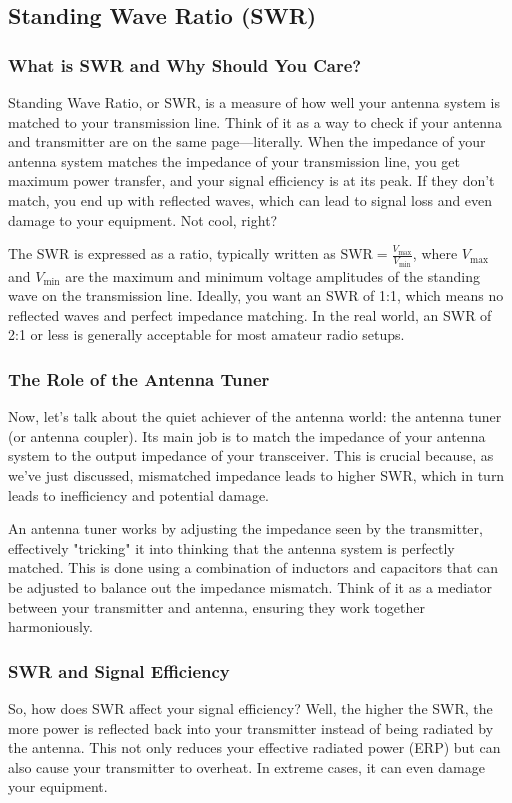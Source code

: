\subsection{Standing Wave Ratio (SWR)}
\label{subsec:standing-wave}

\subsubsection*{What is SWR and Why Should You Care?}
Standing Wave Ratio, or SWR, is a measure of how well your antenna system is matched to your transmission line. Think of it as a way to check if your antenna and transmitter are on the same page—literally. When the impedance of your antenna system matches the impedance of your transmission line, you get maximum power transfer, and your signal efficiency is at its peak. If they don’t match, you end up with reflected waves, which can lead to signal loss and even damage to your equipment. Not cool, right?

The SWR is expressed as a ratio, typically written as \( \text{SWR} = \frac{V_{\text{max}}}{V_{\text{min}}} \), where \( V_{\text{max}} \) and \( V_{\text{min}} \) are the maximum and minimum voltage amplitudes of the standing wave on the transmission line. Ideally, you want an SWR of 1:1, which means no reflected waves and perfect impedance matching. In the real world, an SWR of 2:1 or less is generally acceptable for most amateur radio setups.

\subsubsection*{The Role of the Antenna Tuner}
Now, let’s talk about the quiet achiever of the antenna world: the antenna tuner (or antenna coupler). Its main job is to match the impedance of your antenna system to the output impedance of your transceiver. This is crucial because, as we’ve just discussed, mismatched impedance leads to higher SWR, which in turn leads to inefficiency and potential damage.

An antenna tuner works by adjusting the impedance seen by the transmitter, effectively "tricking" it into thinking that the antenna system is perfectly matched. This is done using a combination of inductors and capacitors that can be adjusted to balance out the impedance mismatch. Think of it as a mediator between your transmitter and antenna, ensuring they work together harmoniously.

\subsubsection*{SWR and Signal Efficiency}
So, how does SWR affect your signal efficiency? Well, the higher the SWR, the more power is reflected back into your transmitter instead of being radiated by the antenna. This not only reduces your effective radiated power (ERP) but can also cause your transmitter to overheat. In extreme cases, it can even damage your equipment. 

